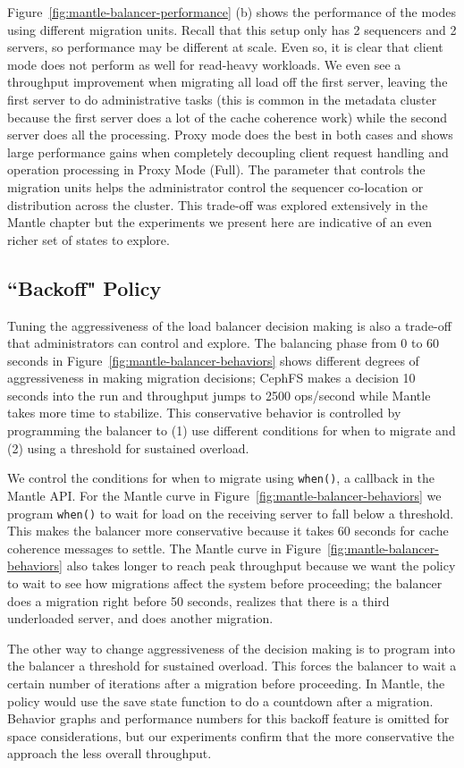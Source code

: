 Figure~\ref{fig:mantle-balancer-performance} (b) shows the performance of the
modes using different migration units. Recall that this setup only has 2
sequencers and 2 servers, so performance may be different at scale. Even so, it
is clear that client mode does not perform as well for read-heavy workloads. We
even see a throughput improvement when migrating all load off the first server,
leaving the first server to do administrative tasks (this is common in the
metadata cluster because the first server does a lot of the cache coherence
work) while the second server does all the processing. Proxy mode does the
best in both cases and shows large performance gains when completely decoupling
client request handling and operation processing in Proxy Mode (Full).  The
parameter that controls the migration units helps the administrator control the
sequencer co-location or distribution across the cluster. This trade-off was
explored extensively in the Mantle chapter but the experiments we present here
are indicative of an even richer set of states to explore.

\subsection{``Backoff" Policy}
\label{sec:feature-backoff}

Tuning the aggressiveness of the load balancer decision making is also a
trade-off that administrators can control and explore. The balancing phase from
0 to 60 seconds in Figure~\ref{fig:mantle-balancer-behaviors} shows different
degrees of aggressiveness in making migration decisions; CephFS makes a
decision 10 seconds into the run and throughput jumps to 2500 ops/second 
while Mantle takes more time to stabilize. This conservative behavior is
controlled by programming the balancer to (1) use different conditions for when
to migrate and (2) using a threshold for sustained overload. 

We control the conditions for when to migrate using \texttt{when()}, a callback
in the Mantle API.  For the Mantle curve in
Figure~\ref{fig:mantle-balancer-behaviors} we program \texttt{when()} to wait
for load on the receiving server to fall below a threshold. This makes the
balancer more conservative because it takes 60 seconds for cache coherence
messages to settle.  The Mantle curve in
Figure~\ref{fig:mantle-balancer-behaviors} also takes longer to reach peak
throughput because we want the policy to wait to see how migrations affect the
system before proceeding; the balancer does a migration right before 50
seconds, realizes that there is a third underloaded server, and does another
migration. 

The other way to change aggressiveness of the decision making is to program
into the balancer a threshold for sustained overload. This forces the balancer
to wait a certain number of iterations after a migration before proceeding. In
Mantle, the policy would use the save state function to do a countdown after a
migration.  Behavior graphs and performance numbers for this backoff feature is
omitted for space considerations, but our experiments confirm that the more
conservative the approach the less overall throughput.
 
